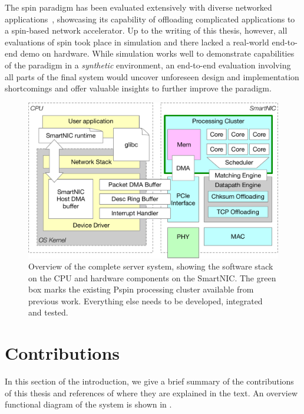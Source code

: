 The \ac{spin} paradigm has been evaluated extensively with diverse networked applications~\cite{di_girolamo_network-accelerated_2019, cao_accelerating_2022, di_girolamo_building_2022}, showcasing its capability of offloading complicated applications to a \ac{spin}-based network accelerator.  Up to the writing of this thesis, however, all evaluations of \ac{spin} took place in simulation and there lacked a real-world end-to-end demo on hardware.  While simulation works well to demonstrate capabilities of the paradigm in a \emph{synthetic} environment, an end-to-end evaluation involving all parts of the final system would uncover unforeseen design and implementation shortcomings and offer valuable insights to further improve the paradigm.

\begin{figure}
    \centering
    \includegraphics[width=.9\textwidth]{figures/system-overview.pdf}
    \caption{Overview of the complete server system, showing the software stack on the CPU and hardware components on the SmartNIC.  The green box marks the existing P\acs{spin} processing cluster available from previous work.  Everything else needs to be developed, integrated and tested.}
    \label{fig:full-system}
\end{figure}

\section{Contributions} \label{sec:contributions}

In this section of the introduction, we give a brief summary of the contributions of this thesis and references of where they are explained in the text.  An overview functional diagram of the system is shown in .

